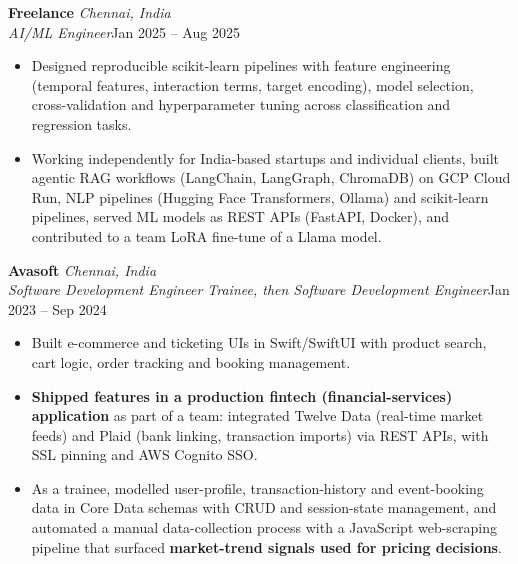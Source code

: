 \documentclass[a4paper,11pt]{article}
\newcommand{\role}[4]{%
  \textbf{#1}{\color{muted}\,\textperiodcentered\,\textit{#2}}\\
  \textit{#4}\hfill{\color{muted}#3}\par}
\newcommand{\gap}{\vspace{5pt}}
\newcommand{\num}[1]{\textbf{#1}}   %
\begin{document}
\gap
{}
\role{Freelance}{Chennai, India}{Jan 2025 – Aug 2025}{AI/ML Engineer}
\begin{itemize}
  \item Designed reproducible scikit-learn pipelines with feature engineering (temporal features, interaction terms, target encoding), model selection, cross-validation and hyperparameter tuning across classification and regression tasks.
  \item Working independently for India-based startups and individual clients, built agentic RAG workflows (LangChain, LangGraph, ChromaDB) on GCP Cloud Run, NLP pipelines (Hugging Face Transformers, Ollama) and scikit-learn pipelines, served ML models as REST APIs (FastAPI, Docker), and contributed to a team LoRA fine-tune of a Llama model.
\end{itemize}
\gap
{}
\role{Avasoft}{Chennai, India}{Jan 2023 – Sep 2024}{Software Development Engineer Trainee, then Software Development Engineer}
\begin{itemize}
  \item Built e-commerce and ticketing UIs in Swift/SwiftUI with product search, cart logic, order tracking and booking management.
  \item \num{Shipped features in a production fintech (financial-services) application} as part of a team: integrated Twelve Data (real-time market feeds) and Plaid (bank linking, transaction imports) via REST APIs, with SSL pinning and AWS Cognito SSO.
  \item As a trainee, modelled user-profile, transaction-history and event-booking data in Core Data schemas with CRUD and session-state management, and automated a manual data-collection process with a JavaScript web-scraping pipeline that surfaced \num{market-trend signals used for pricing decisions}.
\end{itemize}
\end{document}
